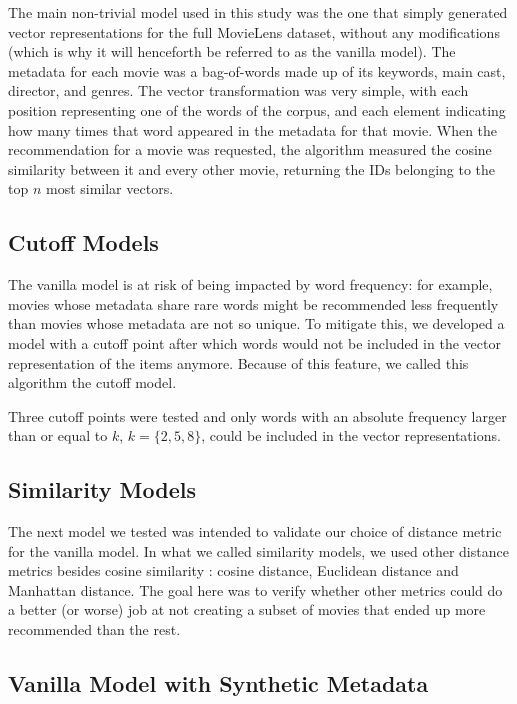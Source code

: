 The main non-trivial model used in this study was the one that simply generated
vector representations for the full MovieLens dataset, without any modifications
(which is why it will henceforth be referred to as the vanilla model). The
metadata for each movie was a bag-of-words made up of its keywords, main cast,
director, and genres. The vector transformation was very simple, with each
position representing one of the words of the corpus, and each element
indicating how many times that word appeared in the metadata for that movie.
When the recommendation for a movie was requested, the algorithm measured the
cosine similarity between it and every other movie, returning the IDs belonging
to the top $n$ most similar vectors.

\subsection{Cutoff Models}
\label{subsec:cutoff}

The vanilla model is at risk of being impacted by word frequency: for example,
movies whose metadata share rare words might be recommended less frequently than
movies whose metadata are not so unique. To mitigate this, we developed a model
with a cutoff point after which words would not be included in the vector
representation of the items anymore. Because of this feature, we called this
algorithm the cutoff model.

Three cutoff points were tested and only words with an absolute frequency larger
than or equal to $k$, $k = \{2, 5, 8\}$, could be included in the vector
representations.

\subsection{Similarity Models}
\label{subsec:similarity}

The next model we tested was intended to validate our choice of distance metric
for the vanilla model. In what we called similarity models, we used other
distance metrics besides cosine similarity \citep{ricci_introduction_2011}:
cosine distance, Euclidean distance and Manhattan distance. The goal here was to
verify whether other metrics could do a better (or worse) job at not creating a
subset of movies that ended up more recommended than the rest.

\subsection{Vanilla Model with Synthetic Metadata}
\label{subsec:synthetic}

